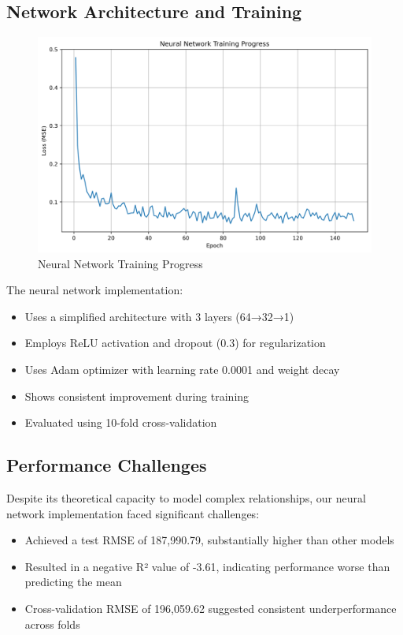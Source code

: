\subsection{Network Architecture and Training}
\begin{figure}[H]
    \centering
    \includegraphics[width=1.0\textwidth]{figures/neural_network_training.png}
    \caption{Neural Network Training Progress}
    \label{fig:nn_training}
\end{figure}

The neural network implementation:
\begin{itemize}
    \item Uses a simplified architecture with 3 layers (64→32→1)
    \item Employs ReLU activation and dropout (0.3) for regularization
    \item Uses Adam optimizer with learning rate 0.0001 and weight decay
    \item Shows consistent improvement during training
    \item Evaluated using 10-fold cross-validation
\end{itemize}

\subsection{Performance Challenges}
Despite its theoretical capacity to model complex relationships, our neural network implementation faced significant challenges:
\begin{itemize}
    \item Achieved a test RMSE of 187,990.79, substantially higher than other models
    \item Resulted in a negative R² value of -3.61, indicating performance worse than predicting the mean
    \item Cross-validation RMSE of 196,059.62 suggested consistent underperformance across folds
\end{itemize}

